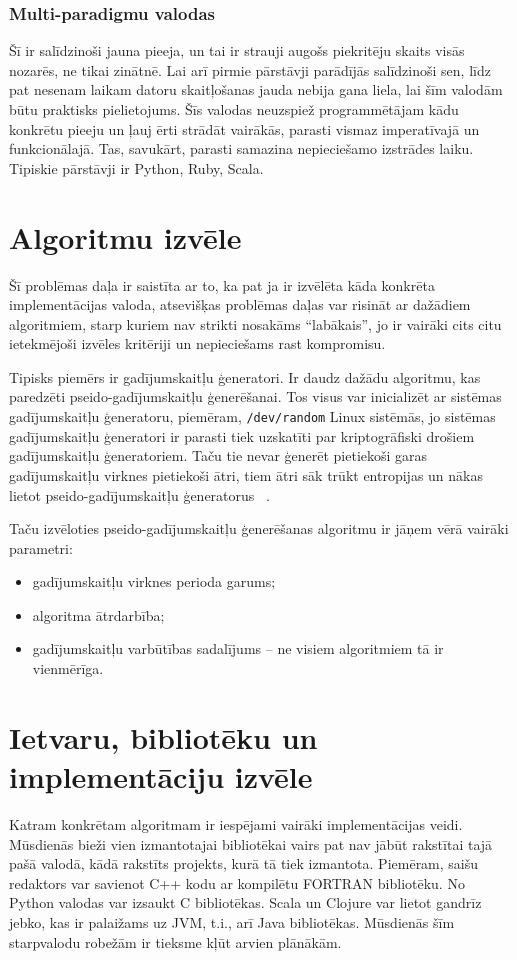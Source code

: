 \documentclass{ludis}
\begin{document}
\subsubsection{Multi-paradigmu valodas}  \label{sec:multi_paradigm}
Šī ir salīdzinoši jauna pieeja, un tai ir strauji augošs piekritēju skaits visās nozarēs, ne tikai zinātnē. Lai arī pirmie pārstāvji parādījās salīdzinoši sen, līdz pat nesenam laikam datoru skaitļošanas jauda nebija gana liela, lai šīm valodām būtu praktisks pielietojums. Šīs valodas neuzspiež programmētājam kādu konkrētu pieeju un ļauj ērti strādāt vairākās, parasti vismaz imperatīvajā un funkcionālajā. Tas, savukārt, parasti samazina nepieciešamo izstrādes laiku. Tipiskie pārstāvji ir Python, Ruby, Scala.

\section{Algoritmu izvēle}
Šī problēmas daļa ir saistīta ar to, ka pat ja ir izvēlēta kāda konkrēta implementācijas valoda, atsevišķas problēmas daļas var risināt ar dažādiem algoritmiem, starp kuriem nav strikti nosakāms ``labākais'', jo ir vairāki cits citu ietekmējoši izvēles kritēriji un nepieciešams rast kompromisu. 

Tipisks piemērs ir gadījumskaitļu ģeneratori. Ir daudz dažādu algoritmu, kas paredzēti pseido-gadījumskaitļu ģenerēšanai. Tos visus var inicializēt ar sistēmas gadījumskaitļu ģeneratoru, piemēram, \texttt{/dev/random} Linux sistēmās, jo sistēmas gadījumskaitļu ģeneratori ir parasti tiek uzskatīti par kriptogrāfiski drošiem gadījumskaitļu ģeneratoriem. Taču tie nevar ģenerēt pietiekoši garas gadījumskaitļu virknes pietiekoši ātri, tiem ātri sāk trūkt entropijas un nākas lietot pseido-gadījumskaitļu ģeneratorus ~\cite{man_random}.

Taču izvēloties pseido-gadījumskaitļu ģenerēšanas algoritmu ir jāņem vērā vairāki parametri:
\begin{itemize}
\item gadījumskaitļu virknes perioda garums;
\item algoritma ātrdarbība;
\item gadījumskaitļu varbūtības sadalījums -- ne visiem algoritmiem tā ir vienmērīga.
\end{itemize}

\section{Ietvaru, bibliotēku un implementāciju izvēle}
Katram konkrētam algoritmam ir iespējami vairāki implementācijas veidi. Mūsdienās bieži vien izmantotajai bibliotēkai vairs pat nav jābūt rakstītai tajā pašā valodā, kādā rakstīts projekts, kurā tā tiek izmantota. Piemēram, saišu redaktors var savienot C++ kodu ar kompilētu FORTRAN bibliotēku. No Python valodas var izsaukt C bibliotēkas. Scala un Clojure var lietot gandrīz jebko, kas ir palaižams uz JVM, t.i., arī Java bibliotēkas. Mūsdienās šīm starpvalodu robežām ir tieksme kļūt arvien plānākām.
\end{document}
